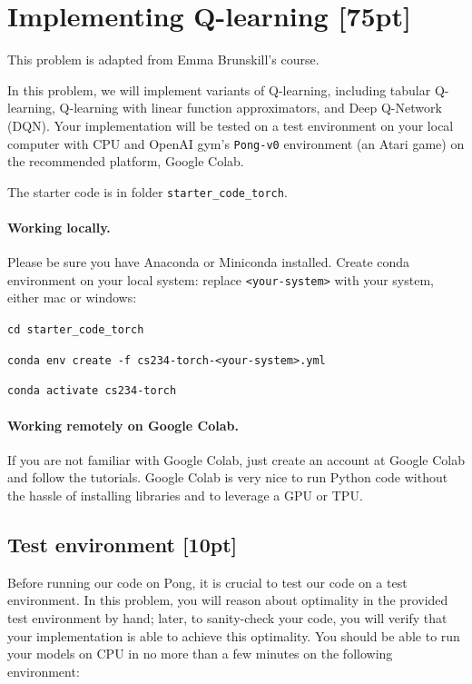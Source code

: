 \documentclass[11pt]{article}
\theoremstyle{case}
\begin{document}
\newpage
\section{Implementing Q-learning [75pt]}


This problem is adapted from Emma Brunskill's course.

In this problem, we will implement variants of Q-learning, including tabular Q-learning, Q-learning with linear function approximators, and Deep Q-Network (DQN).
Your implementation will be tested on a test environment on your local computer with CPU and OpenAI gym's \texttt{Pong-v0} environment (an Atari game) on the recommended platform, Google Colab.

The starter code is in folder \texttt{starter\_code\_torch}.

\paragraph{Working locally.}
Please be sure you have Anaconda or Miniconda installed.
Create conda environment on your local system: replace \texttt{<your-system>} with your system, either mac or windows:

    \texttt{cd starter\_code\_torch}
    
    \texttt{conda env create -f cs234-torch-<your-system>.yml}
    
    \texttt{conda activate cs234-torch}


\paragraph{Working remotely on Google Colab.}
If you are not familiar with Google Colab, just create an account at Google Colab and follow the tutorials. Google Colab is very nice to run Python code without the hassle of installing libraries and to leverage a GPU or TPU.

\subsection{Test environment [10pt]}
\label{sec:Test environment}
Before running our code on Pong, it is crucial to test our code on a test environment. In this problem, you will reason about optimality in the provided test environment by hand; later, to sanity-check your code, you will verify that your implementation is able to achieve this optimality. You should be able to run your models on CPU in no more than a few minutes on the following environment:
\end{document}
